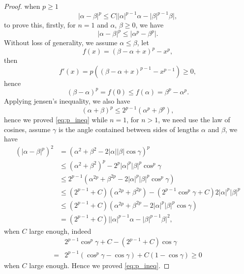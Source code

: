\documentclass[11pt]{amsart}
\theoremstyle{definition}
\numberwithin{equation}{section}
\newcommand*\abs[1]{\lvert#1\rvert}
\begin{document}
\begin{proof}
	when $p \geq 1 $
	\begin{equation}\label{eq:p_ineq}
		\abs{\alpha-\beta}^p \leq C\abs{\abs{\alpha}^{p-1}\alpha - \abs{\beta}^{p-1}\beta},
	\end{equation}
	to prove this, firstly, for $n = 1$ and $\alpha$, $\beta \geq 0$, we have
	\begin{equation}
		\abs{\alpha-\beta}^p \leq \abs{\alpha^p - \beta^p}.
	\end{equation}
	Without loss of generality, we assume $\alpha \leq \beta$, let
	\begin{equation}
		f(x) = (\beta-\alpha+x)^p - x^p,
	\end{equation}
	then
	\begin{equation}
		f'(x) = p\left((\beta-\alpha+x)^{p-1} - x^{p-1}\right) \geq 0,
	\end{equation}
	hence
	\begin{equation}
		\left(\beta-\alpha\right)^p = f(0) \leq f(\alpha) = \beta^p - \alpha^p.
	\end{equation}
	Applying jensen's inequality, we also have
	\begin{equation}
		\left(\alpha+\beta\right)^p \leq 2^{p-1}\left(\alpha^p + \beta^p\right),
	\end{equation}
	hence we proved \cref{eq:p_ineq} while $n = 1$, for $n > 1$, we need use
	the law of cosines, assume $\gamma$ is the angle contained between sides
	of lengths $\alpha$ and $\beta$, we have
	\begin{equation}
		\begin{split}
			\left(\abs{\alpha-\beta}^p\right)^2
			&= \left(\alpha^2 + \beta^2 - 2 \abs{\alpha}\abs{\beta}\cos{\gamma}\right)^p\\
			&\leq \left(\alpha^2+\beta^2\right)^p - 2^p\abs{\alpha}^p\abs{\beta}^p\cos^p{\gamma}\\
			&\leq 2^{p-1}\left(\alpha^{2p} + \beta^{2p} - 2\abs{\alpha}^p\abs{\beta}^p\cos^p{\gamma}\right)\\
			&\leq \left(2^{p-1}+C\right)\left(\alpha^{2p} + \beta^{2p}\right)
			- \left(2^{p-1}\cos^p{\gamma}+C\right)2\abs{\alpha}^p\abs{\beta}^p\\
			&\leq \left(2^{p-1}+C\right)\left(\alpha^{2p} + \beta^{2p} - 2\abs{\alpha}^p\abs{\beta}^p\cos{\gamma}\right)\\
			&= \left(2^{p-1}+C\right)\abs{\abs{\alpha}^{p-1}\alpha - \abs{\beta}^{p-1}\beta}^2,
		\end{split}
	\end{equation}
	when $C$ large enough, indeed
	\begin{equation}
		\begin{split}
			& 2^{p-1}\cos^p{\gamma} + C - \left(2^{p-1}+C\right)\cos{\gamma}\\
			={} & 2^{p-1}\left(\cos^p{\gamma} - \cos{\gamma}\right) + C\left(1-\cos{\gamma}\right)
			\geq 0
		\end{split}
	\end{equation}
	when $C$ large enough. Hence we proved \cref{eq:p_ineq}.


\end{proof}
\end{document}

